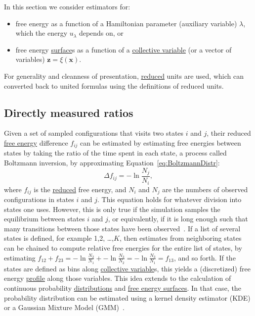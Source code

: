 \documentclass[9pt,review]{livecoms}
\newcommand{\vx}{\mathbf{x}}
\newcommand{\vz}{\mathbf{z}}
\begin{document}
In this section we consider estimators for:
\begin{itemize}
    \item free energy as a function of a Hamiltonian parameter (auxiliary variable) $\lambda$, which the energy $u_\lambda$ depends on, or
    \item free energy \hyperlink{ref:FES} {surface}s as a function of a \hyperlink{ref:CV} {collective variable} (or a vector of variables) $\vz = \xi(\vx)$.
\end{itemize}

For generality and cleanness of presentation, \hyperlink{ref:reduced} {reduced} units are used, which can converted back to united formulas using the definitions of reduced units.

\subsection{Directly measured ratios}

Given a set of sampled configurations that visits two states $i$ and $j$, their reduced \hyperlink{ref:FE} {free energy} difference $f_{ij}$ can be estimated by estimating free energies between states by taking the ratio of the time spent in each state, a process called Boltzmann inversion, by approximating Equation~\eqref{eq:BoltzmannDistr}:
\begin{equation}
\Delta f_{ij} = -\ln \frac{N_j}{N_i},
\label{eq:boltzmann_inversion}
\end{equation}
where $f_{ij}$ is the \hyperlink{ref:reduced} {reduced} free energy, and $N_i$ and $N_j$ are the numbers of observed configurations in states $i$ and $j$.  This equation holds for whatever division into states one uses. However, this is only true if the simulation samples the equilibrium between states $i$ and $j$, or equivalently, if it is long enough such that many transitions between those states have been observed~\cite{No2009}. If a list of several states is defined, for example 1,2, \ldots,$K$, then estimates from neighboring states can be chained to compute relative free energies for the entire list of states, by estimating $f_{12} + f_{23} = -\ln \frac{N_2}{N_1} + -\ln \frac{N_3}{N_2} =   -\ln \frac{N_3}{N_1} = f_{13}$, and so forth. If the states are defined as bins along \hyperlink{ref:CV} {collective variable}s, this yields a (discretized) free energy \hyperlink{ref:FES} {profile} along those variables. This idea extends to the calculation of continuous probability \hyperlink{ref:Distribution} {distributions} and \hyperlink{ref:FES} {free energy surfaces}. In that case, the probability distribution can be estimated using a kernel density estimator (KDE) or a Gaussian Mixture Model (GMM)~\cite{Westerlund2017}.
\end{document}
